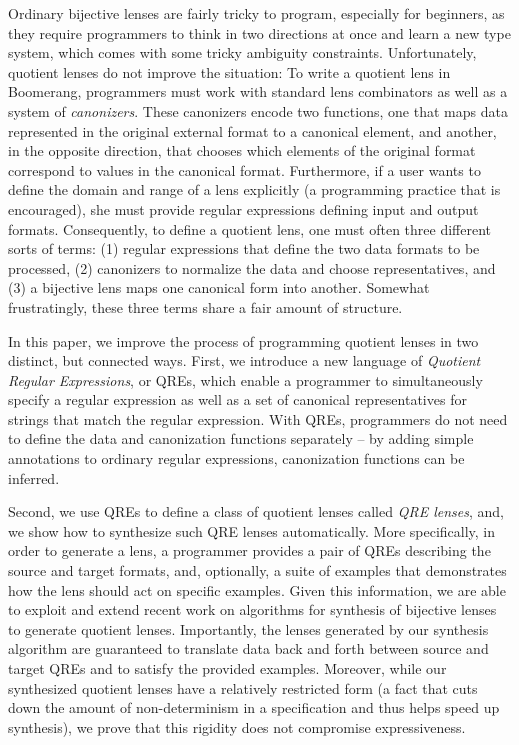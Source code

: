 \documentclass[acmsmall,review,anonymous]{acmart}\settopmatter{printfolios=true,printccs=false,printacmref=false}
\begin{document}
Ordinary bijective lenses are fairly tricky to program, especially for
beginners, as they require programmers to think in two directions at once
and learn a new type system, which comes with some tricky ambiguity constraints.
Unfortunately, quotient lenses do not improve the situation:  To
write a quotient lens in Boomerang, programmers must work with standard lens
combinators as well as a system of \emph{canonizers}.
These canonizers encode two functions, one that
maps data represented in the original external format
to a canonical element, and another, in the opposite direction, that chooses
which elements of the original format correspond to values in the canonical
format. Furthermore, if a user wants to define the domain and range of
a lens explicitly (a programming practice that is encouraged), she must
provide regular expressions defining input and output formats.
Consequently, to define a quotient lens, one must often three different sorts
of terms: (1) regular expressions that define the two data formats
to be processed, (2) canonizers to normalize the data
and choose representatives, and (3) a bijective lens maps
one canonical form into another.  Somewhat frustratingly,
these three terms share a fair amount of structure.

In this paper, we improve the process of programming quotient lenses
in two distinct, but connected ways. First, we
introduce a new language of {\em Quotient Regular Expressions}, or QREs, which
enable a programmer to simultaneously specify a regular expression as well as
a set of canonical representatives for strings that match the regular
expression. With
QREs, programmers do not need to define the data and canonization functions
separately -- by adding simple annotations to ordinary regular expressions,
canonization functions can be inferred.

Second, we use QREs to define a class of quotient lenses called {\em QRE
lenses}, and, we show how to synthesize such QRE
lenses automatically.  
More specifically, in
order to generate a lens, a programmer provides a pair of QREs
describing the source and target formats, and, optionally,
a suite of examples that demonstrates how the
lens should act on specific examples.  Given this information,
we are able to exploit and extend recent work on algorithms for synthesis of
bijective lenses~\cite{optician} to generate quotient lenses.
Importantly, the lenses generated by
our synthesis algorithm are guaranteed to translate data back and forth
between source and target QREs and to satisfy the provided examples.
Moreover, while our synthesized quotient lenses have a relatively
restricted form (a fact that cuts down the amount of non-determinism in
a specification and thus helps speed up synthesis), we prove that
this rigidity does not compromise expressiveness.
\end{document}
